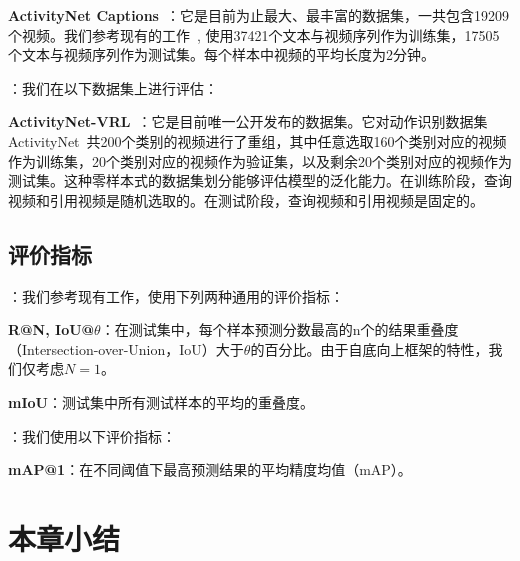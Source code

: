 \noindent\textbf{ActivityNet Captions}~\cite{krishna2017dense}：它是目前为止最大、最丰富的数据集，一共包含19209个视频。我们参考现有的工作~\cite{yuan2019find}, 使用37421个文本与视频序列作为训练集，17505个文本与视频序列作为测试集。每个样本中视频的平均长度为2分钟。


\noindent\textbf{}：我们在以下数据集上进行评估：

\noindent\textbf{ActivityNet-VRL}~\cite{feng2018video}：它是目前唯一公开发布的数据集。它对动作识别数据集ActivityNet~\cite{caba2015activitynet}共200个类别的视频进行了重组，其中任意选取160个类别对应的视频作为训练集，20个类别对应的视频作为验证集，以及剩余20个类别对应的视频作为测试集。这种零样本式的数据集划分能够评估模型的泛化能力。在训练阶段，查询视频和引用视频是随机选取的。在测试阶段，查询视频和引用视频是固定的。

\subsection{评价指标}


\noindent\textbf{}：我们参考现有工作，使用下列两种通用的评价指标：

\noindent\textbf{R@N, IoU@$\theta$}：在测试集中，每个样本预测分数最高的n个的结果重叠度（Intersection-over-Union，IoU）大于$\theta$的百分比。由于自底向上框架的特性，我们仅考虑$N=1$。

\noindent\textbf{mIoU}：测试集中所有测试样本的平均的重叠度。


\noindent\textbf{}：我们使用以下评价指标：

\noindent\textbf{mAP@1}：在不同阈值下最高预测结果的平均精度均值（mAP）。

\section{本章小结}


